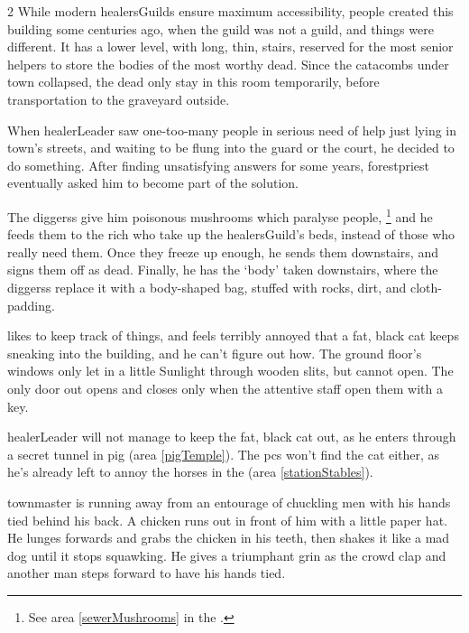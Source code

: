 \begin{multicols}{2}
While modern \glspl{healersGuild} ensure maximum accessibility, people created this building some centuries ago, when the guild was not a guild, and things were different.
It has a lower level, with long, thin, stairs, reserved for the most senior \glspl{helper} to store the bodies of the most worthy dead.
Since the catacombs under \gls{town} collapsed, the dead only stay in this room temporarily, before transportation to the graveyard outside.

\healerLeader

\begin{exampletext}
  When \gls{healerLeader} saw one-too-many people in serious need of help just lying in \gls{town}'s streets, and waiting to be flung into the \gls{guard} or the \gls{court}, he decided to do something.
  After finding unsatisfying answers for some years, \gls{forestpriest} eventually asked him to become part of the solution.

  The \glspl{diggers} give him poisonous mushrooms which paralyse people,%
  \footnote{See area \vref{sewerMushrooms} in the .}
  and he feeds them to the rich who take up the \gls{healersGuild}'s beds, instead of those who really need them.
  Once they freeze up enough, he sends them downstairs, and signs them off as dead.
  Finally, he has the `body' taken downstairs, where the \glspl{diggers} replace it with a body-shaped bag, stuffed with rocks, dirt, and cloth-padding.
\end{exampletext}

 likes to keep track of things, and feels terribly annoyed that a fat, black cat keeps sneaking into the building, and he can't figure out how.
The ground floor's windows only let in a little Sunlight through wooden slits, but cannot open.
The only door out opens and closes only when the attentive staff open them with a key.

\Gls{healerLeader} will not manage to keep the fat, black cat out, as he enters through a secret tunnel in \gls{pig} (area \vref{pigTemple}).
The \glspl{pc} won't find the cat either, as he's already left to annoy the horses in the  (area \vref{stationStables}).

\begin{boxtext}
  \Gls{townmaster} is running away from an entourage of chuckling men with his hands tied behind his back.
   A chicken runs out in front of him with a little paper hat.
   He lunges forwards and grabs the chicken in his teeth, then shakes it like a mad dog until it stops squawking.
   He gives a triumphant grin as the crowd clap and another man steps forward to have his hands tied.
\end{boxtext}


\end{multicols}
